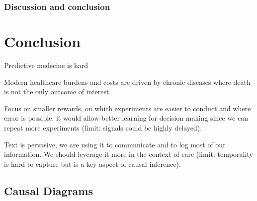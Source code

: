 \documentclass{report}
\begin{document}
\subsection{Discussion and conclusion}




\chapter{Conclusion}\label{chapter:conclusion}

Predictive medecine is hard

Modern healthcare burdens and costs are driven by chronic diseases where death
is not the only outcome of interest.

Focus on smaller rewards, on which experiments are easier to conduct and where
error is possible: it would allow better learning for decision making since we
can repeat more experiments (limit: signals could be highly delayed).

Text is pervasive, we are using it to communicate and to log most of our
information. We should leverage it more in the context of care (limit:
temporality is hard to capture but is a key aspect of causal inference).


\printbibliography

\appendix

\clearpage

\section{Causal Diagrams}
\end{document}

